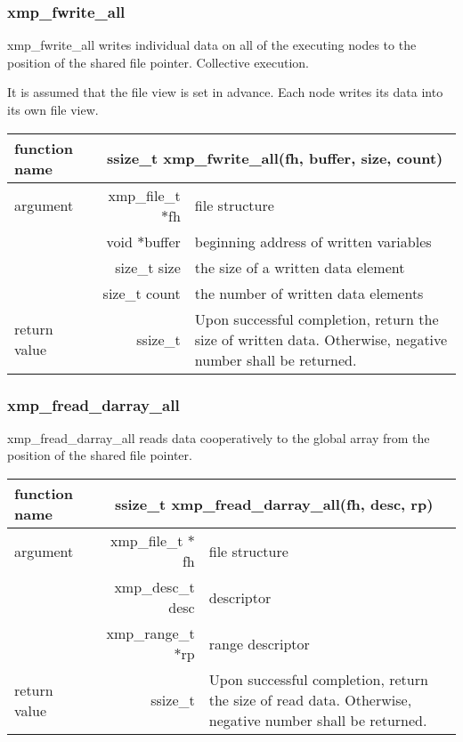    \subsubsection{xmp\_fwrite\_all}
   xmp\_fwrite\_all writes individual data on all of the executing nodes
   to the position of the shared file pointer. Collective execution.

   It is assumed that the file view is set in advance. Each node writes
   its data into its own file view.

   \begin{table}[h]
    \begin{center}
     \begin{tabular}{|l|r|p{80mm}|}
      \hline
      {\bf function name}  & \multicolumn{2}{c|}{\bf ssize\_t
      xmp\_fwrite\_all(fh, buffer, size, count)}  \\ \hline \hline
      argument & xmp\_file\_t $*$fh & file structure \\ \cline{2-3}
      & void $*$buffer & beginning address of written variables \\ \cline{2-3}
      & size\_t size & the size of a written data element \\ \cline{2-3}
      & size\_t count & the number of written data elements \\ \hline
      return value & ssize\_t & Upon successful completion, return the size
      of written data. Otherwise, negative number shall be
      returned. \\ \hline
      \end{tabular}
     \end{center}
   \end{table}

   \subsubsection{xmp\_fread\_darray\_all}
   xmp\_fread\_darray\_all reads data cooperatively to the global array from the position of the shared file pointer.

   \begin{table}[h]
    \begin{center}
     \begin{tabular}{|l|r|p{80mm}|}
      \hline
      {\bf function name}  & \multicolumn{2}{c|}{\bf ssize\_t
      xmp\_fread\_darray\_all(fh, desc, rp)} \\ \hline \hline
      argument & xmp\_file\_t $*$fh & file structure \\ \cline{2-3}
      & xmp\_desc\_t desc & descriptor \\ \cline{2-3}
      & xmp\_range\_t $*$rp & range descriptor \\ \hline
      return value & ssize\_t & Upon successful completion, return the size
	      of read data. Otherwise, negative number shall be
	      returned. \\ \hline
      \end{tabular}
     \end{center}
   \end{table}

